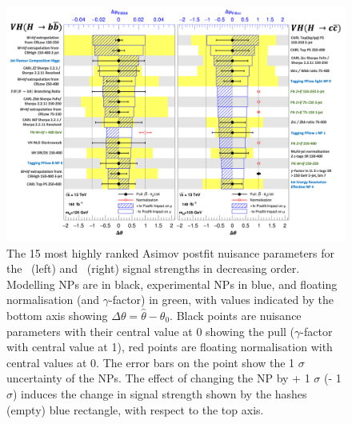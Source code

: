 \begin{figure}[h!]
    \centering
    \includegraphics[width=\textwidth]{Images/VH/Fit/fromSlides/ranking.png}
    \caption{The 15 most highly ranked Asimov postfit nuisance parameters for the \vhb\ (left) and \vhc\ (right) signal strengths in decreasing order. Modelling NPs are in black, experimental NPs in blue, and floating normalisation (and $\gamma$-factor) in green, with values indicated by the bottom axis showing $\Delta \theta = \hat{\theta} - \theta_0$. Black points are nuisance parameters with their central value at 0 showing the pull ($\gamma$-factor with central value at 1), red points are floating normalisation with central values at 0. The error bars on the point show the 1 $\sigma$ uncertainty of the NPs. The effect of changing the NP by + 1 $\sigma$ (- 1 $\sigma$) induces the change in signal strength shown by the hashes (empty) blue rectangle, with respect to the top axis.}
    \label{fig:rankingPostfit}
\end{figure} 

